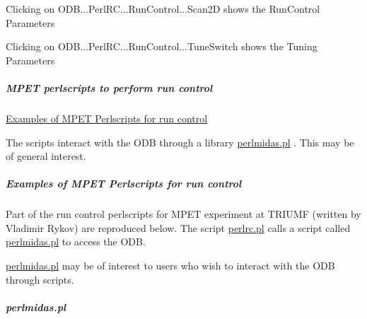 \begin{DoxyItemize}
\item Clicking on ODB...PerlRC...RunControl...Scan2D shows the RunControl Parameters 
\item Clicking on ODB...PerlRC...RunControl...TuneSwitch shows the Tuning Parameters 
\end{DoxyItemize}

\par
 

 \par
\hypertarget{RC_mhttpd_defining_script_buttons_RC_odb_script_ex2_perlscript}{}\subparagraph{MPET perlscripts to perform run control}\label{RC_mhttpd_defining_script_buttons_RC_odb_script_ex2_perlscript}

\begin{DoxyItemize}
\item \hyperlink{RC_mhttpd_perlrc}{Examples of MPET Perlscripts for run control}
\end{DoxyItemize}

The scripts interact with the ODB through a library \hyperlink{RC_mhttpd_perlrc_RC_mhttpd_perlmidas_script}{perlmidas.pl} . This may be of general interest.



\par
 \label{index_end}
\hypertarget{index_end}{}
 \subparagraph{Examples of MPET Perlscripts for run control}\label{RC_mhttpd_perlrc}
\par


 \label{RC_mhttpd_perlrc_idx_script_perlmidas}
\hypertarget{RC_mhttpd_perlrc_idx_script_perlmidas}{}


Part of the run control perlscripts for MPET experiment at TRIUMF (written by Vladimir Rykov) are reproduced below. The script \hyperlink{RC_mhttpd_perlrc_RC_mhttpd_perlrc_script}{perlrc.pl} calls a script called \hyperlink{RC_mhttpd_perlrc_RC_mhttpd_perlmidas_script}{perlmidas.pl} to access the ODB.

\hyperlink{RC_mhttpd_perlrc_RC_mhttpd_perlmidas_script}{perlmidas.pl} may be of interest to users who wish to interact with the ODB through scripts.\hypertarget{RC_mhttpd_perlrc_RC_mhttpd_perlmidas_script}{}\subparagraph{perlmidas.pl}\label{RC_mhttpd_perlrc_RC_mhttpd_perlmidas_script}

